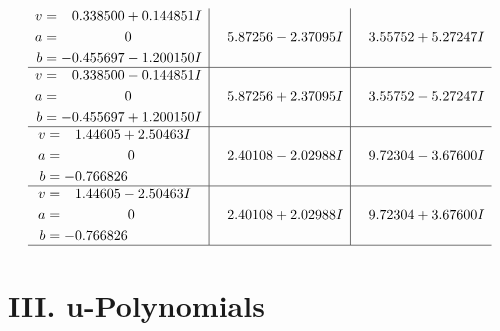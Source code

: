 \documentclass[1p]{elsarticle_modified}
\theoremstyle{definition}
\begin{document}
$$\begin{array}{c|c|c}
\begin{aligned}
v &= \phantom{-}0.338500 + 0.144851 I \\
a &= \phantom{-0.000000 } 0 \\
b &= -0.455697 - 1.200150 I\end{aligned}
 & \phantom{-}5.87256 - 2.37095 I & \phantom{-}3.55752 + 5.27247 I \\ \hline\begin{aligned}
v &= \phantom{-}0.338500 - 0.144851 I \\
a &= \phantom{-0.000000 } 0 \\
b &= -0.455697 + 1.200150 I\end{aligned}
 & \phantom{-}5.87256 + 2.37095 I & \phantom{-}3.55752 - 5.27247 I \\ \hline\begin{aligned}
v &= \phantom{-}1.44605 + 2.50463 I \\
a &= \phantom{-0.000000 } 0 \\
b &= -0.766826\phantom{ +0.000000I}\end{aligned}
 & \phantom{-}2.40108 - 2.02988 I & \phantom{-}9.72304 - 3.67600 I \\ \hline\begin{aligned}
v &= \phantom{-}1.44605 - 2.50463 I \\
a &= \phantom{-0.000000 } 0 \\
b &= -0.766826\phantom{ +0.000000I}\end{aligned}
 & \phantom{-}2.40108 + 2.02988 I & \phantom{-}9.72304 + 3.67600 I\\
 \hline 
 \end{array}$$\newpage
\newpage\renewcommand{\arraystretch}{1}
\centering \section*{ III. u-Polynomials}
\end{document}
